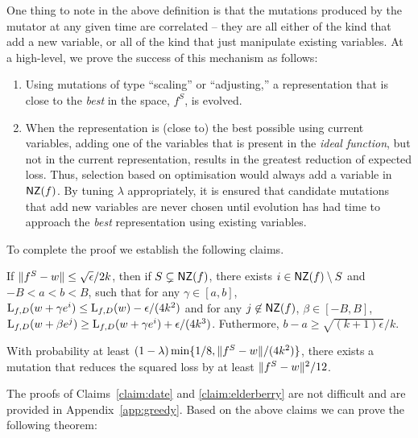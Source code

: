 One thing to note in the above definition is that the mutations produced by the
mutator at any given time are correlated -- \ie they are all either of the kind
that add a new variable, or all of the kind that just manipulate existing
variables.  At a high-level, we prove the success of this mechanism as follows:
\begin{enumerate}
%
\item Using mutations of type ``scaling'' or ``adjusting,'' a representation
that is close to the \emph{best} in the space, \ie $f^S$, is evolved.
%
\item When the representation is (close to) the best possible using current
variables, adding one of the variables that is present in the \emph{ideal
function}, but not in the current representation, results in the greatest
reduction of expected loss. Thus, selection based on optimisation would always
add a variable in $\mathsf{NZ}(f)$. By tuning $\lambda$ appropriately, it is ensured
that candidate mutations that add new variables are never chosen until evolution
has had time to approach the \emph{best} representation using existing
variables.
%
\end{enumerate}

To complete the proof we establish the following claims.

\begin{claim} \label{claim:date} If $\Vert f^S - w \Vert \leq
\sqrt{\epsilon}/{2k}$, then if $S \subsetneq \mathsf{NZ}(f)$, there exists $i \in \mathsf{NZ}(f)
\setminus S$ and $-B < a < b < B$, such that for any $\gamma \in [a, b]$,
$\mathrm{L}_{f, D}(w + \gamma e^i) \leq \mathrm{L}_{f, D}(w) - \epsilon/(4k^2)$ and for
any $j \not\in \mathsf{NZ}(f)$, $\beta \in [-B, B]$, $\mathrm{L}_{f, D}(w + \beta e^j) \geq
\mathrm{L}_{f, D}(w + \gamma e^i) + \epsilon/(4k^3)$. Futhermore, $b - a \geq
\sqrt{(k+1) \epsilon}/k$. \end{claim}

\begin{claim} \label{claim:elderberry} With probability at least $(1 - \lambda)
\min\{1/8, \Vert f^S - w \Vert/(4k^2)\}$, there exists a mutation that reduces the
squared loss by at least $\Vert f^S - w \Vert^2/12$. \end{claim}

The proofs of Claims~\ref{claim:date} and \ref{claim:elderberry} are not
difficult and are provided in Appendix~\ref{app:greedy}. Based on the above
claims we can prove the following theorem:

